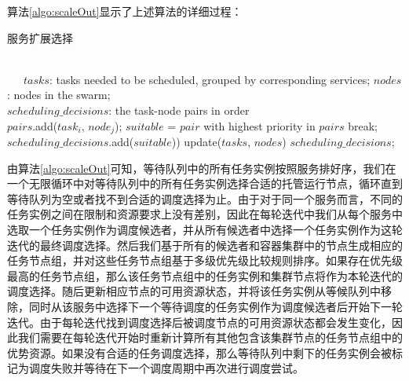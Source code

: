 算法\ref{algo:scaleOut}显示了上述算法的详细过程：
\begin{algorithm}[H]
\caption{服务扩展选择}
\label{algo:scaleOut}
\begin{algorithmic}[0]
\\
\Require ~~\
$tasks$: tasks needed to be scheduled, grouped by corresponding services;
$nodes$: nodes in the swarm;
\Ensure ~~\
\\
$scheduling\_decisions$: the task-node pairs in order \\

                \State $pairs$.add($task_{i}$, $node_{j}$);
            \EndIf
        \EndFor
    \EndFor
    \State $suitable$ = ${pair}$ with highest priority in ${pairs}$
        \State break;
    \EndIf
    \State $scheduling\_decisions$.add($suitable$))  
    \State update($tasks$, $nodes$)
\EndWhile
\State \Return $scheduling\_decisions$;
\end{algorithmic}
\end{algorithm}
由算法\ref{algo:scaleOut}可知，等待队列中的所有任务实例按照服务排好序，我们在一个无限循环中对等待队列中的所有任务实例选择合适的托管运行节点，循环直到等待队列为空或者找不到合适的调度选择为止。由于对于同一个服务而言，不同的任务实例之间在限制和资源要求上没有差别，因此在每轮迭代中我们从每个服务中选取一个任务实例作为调度候选者，并从所有候选者中选择一个任务实例作为这轮迭代的最终调度选择。然后我们基于所有的候选者和容器集群中的节点生成相应的任务节点组，并对这些任务节点组基于多级优先级比较规则排序。如果存在优先级最高的任务节点组，那么该任务节点组中的任务实例和集群节点将作为本轮迭代的调度选择。随后更新相应节点的可用资源状态，并将该任务实例从等候队列中移除，同时从该服务中选择下一个等待调度的任务实例作为调度候选者后开始下一轮迭代。由于每轮迭代找到调度选择后被调度节点的可用资源状态都会发生变化，因此我们需要在每轮迭代开始时重新计算所有其他包含该集群节点的任务节点组中的优势资源。如果没有合适的任务调度选择，那么等待队列中剩下的任务实例会被标记为调度失败并等待在下一个调度周期中再次进行调度尝试。

